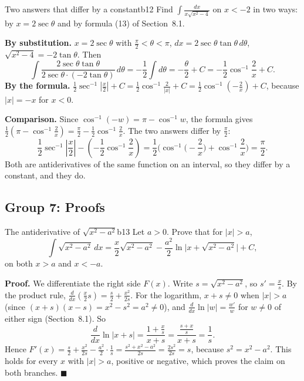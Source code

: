\documentclass[11pt]{article}
\begin{document}
\begin{exmp}{Two answers that differ by a constant}{b12}
Find $\int\frac{dx}{x\sqrt{x^2-4}}$ on $x<-2$ in two ways: by $x=2\sec\theta$ and by formula (13) of Section~8.1.

\textbf{By substitution.} $x=2\sec\theta$ with $\frac\pi2<\theta<\pi$, $dx=2\sec\theta\tan\theta\,d\theta$, $\sqrt{x^2-4}=-2\tan\theta$. Then
\[\int\frac{2\sec\theta\tan\theta}{2\sec\theta\cdot(-2\tan\theta)}\,d\theta=-\frac12\int d\theta=-\frac\theta2+C=-\frac12\cos^{-1}\frac2x+C .\]
\textbf{By the formula.} $\frac12\sec^{-1}\left\lvert\frac x2\right\rvert+C=\frac12\cos^{-1}\frac2{\lvert x\rvert}+C=\frac12\cos^{-1}\left(-\frac2x\right)+C$, because $\lvert x\rvert=-x$ for $x<0$.

\textbf{Comparison.} Since $\cos^{-1}(-w)=\pi-\cos^{-1}w$, the formula gives $\frac12\left(\pi-\cos^{-1}\frac2x\right)=\frac\pi2-\frac12\cos^{-1}\frac2x$. The two answers differ by $\frac\pi2$:
\[\frac12\sec^{-1}\left\lvert\frac x2\right\rvert-\left(-\frac12\cos^{-1}\frac2x\right)=\frac12\Big(\cos^{-1}\Big(-\frac2x\Big)+\cos^{-1}\frac2x\Big)=\frac\pi2 .\]
Both are antiderivatives of the same function on an interval, so they differ by a constant, and they do.
\end{exmp}

\subsection*{Group 7: Proofs}

\begin{exmp}{The antiderivative of $\sqrt{x^2-a^2}$}{b13}
Let $a>0$. Prove that for $\lvert x\rvert>a$,
\[\int\sqrt{x^2-a^2}\,dx=\frac x2\sqrt{x^2-a^2}-\frac{a^2}2\ln\big\lvert x+\sqrt{x^2-a^2}\big\rvert+C ,\]
on both $x>a$ and $x<-a$.

\textbf{Proof.} We differentiate the right side $F(x)$. Write $s=\sqrt{x^2-a^2}$, so $s'=\frac xs$. By the product rule, $\frac{d}{dx}\left(\frac x2s\right)=\frac s2+\frac{x^2}{2s}$. For the logarithm, $x+s\ne0$ when $\lvert x\rvert>a$ (since $(x+s)(x-s)=x^2-s^2=a^2\ne0$), and $\frac{d}{dx}\ln\lvert w\rvert=\frac{w'}w$ for $w\ne0$ of either sign (Section~8.1). So
\[\frac{d}{dx}\ln\lvert x+s\rvert=\frac{1+\frac xs}{x+s}=\frac{\frac{s+x}s}{x+s}=\frac1s .\]
Hence $F'(x)=\frac s2+\frac{x^2}{2s}-\frac{a^2}2\cdot\frac1s=\frac{s^2+x^2-a^2}{2s}=\frac{2s^2}{2s}=s$, because $s^2=x^2-a^2$. This holds for every $x$ with $\lvert x\rvert>a$, positive or negative, which proves the claim on both branches. $\blacksquare$
\end{exmp}
\end{document}
